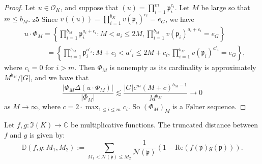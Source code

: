 \documentclass[11pt]{amsart}
\theoremstyle{definition}
\newcommand{\C}{{\mathbb C}}
\newcommand{\D}{{\mathbb D}}
\newcommand{\NN}{{\mathcal N}}
\newcommand{\mf}{\mathfrak}
\begin{document}
\begin{proof}
Let $u \in \mathcal{O}_K$, and suppose that $(u)=\prod_{i=1}^m \mf p_i^{c_i}$.
    Let $M$ be large so that $m\leq b_{M}$. 
z5   
Since $v((u))=\prod_{i=1}^{b_{K}}v(\mathfrak{p}_{i})^{c_{i}}=e_{G}$, we have
\begin{equation*}
    \begin{split}
     &   u\cdot\Phi_{M}=\left\{\prod_{i=1}^{b_{M}}\mathfrak{p}^{a_{i}+c_{i}}_{i}\colon M<a_{i}\leq 2M, \prod_{i=1}^{b_{M}}v(\mathfrak{p}_{i})^{a_{i}+c_{i}}=e_{G}\right\}
     \\&\quad\;\;\;\;\quad=\left\{\prod_{i=1}^{b_{M}}\mathfrak{p}^{a'_{i}}_{i}\colon M+c_{i}<a'_{i}\leq 2M+c_{i}, \prod_{i=1}^{b_{M}}v(\mathfrak{p}_{i})^{a'_{i}}=e_{G}\right\},
    \end{split}
\end{equation*}
   where $c_{i}=0$ for $i>m$. %
   Then $\Phi_{M}$ is nonempty as its cardinality is approximately $M^{b_{M}}/\vert G\vert$, and we have that
    $$\frac{\vert\Phi_{M}\Delta (u\cdot \Phi_{M})\vert}{\vert\Phi_{M}\vert}\lesssim\frac{\vert G\vert c^{m}(M+c)^{b_{M}-1}}{M^{b_{M}}}\to 0$$
    as $M\to\infty$,  where $c=2\cdot\max_{1\leq i\leq m}c_{i}$. So $(\Phi_{M})_M$ is a F\o lner sequence. %
\end{proof}


Let $f,g\colon\mf  I(K)\to\C$ be multiplicative functions. The truncated distance between $f$ and $g$ is given by:
$$\D(f,g;M_{1},M_{2}):=\sum_{M_{1}<\NN(\mf p)\leq M_{2}}\frac{1}{\NN(\mf p)}(1-\text{Re}(f(\mf p)\overline{g}(\mf p))).$$
\end{document}
